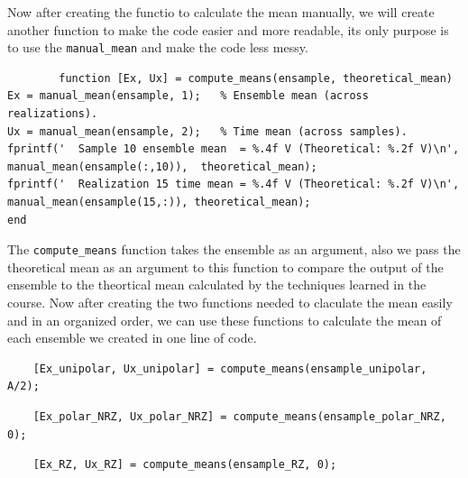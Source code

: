 Now after creating the functio to calculate the mean manually, we will create
another function to make the code easier and more readable, its only purpose is
to use the \texttt{manual\_mean} and make the code less messy.

\begin{listing} [!htpb]
    \caption{Mean Calculation Wrapper Function.}
    \label{listing:MeanCalculationWrapperFunction}
    \begin{verbatim}
        function [Ex, Ux] = compute_means(ensample, theoretical_mean)
Ex = manual_mean(ensample, 1);   % Ensemble mean (across realizations).
Ux = manual_mean(ensample, 2);   % Time mean (across samples).
fprintf('  Sample 10 ensemble mean  = %.4f V (Theoretical: %.2f V)\n', manual_mean(ensample(:,10)),  theoretical_mean);
fprintf('  Realization 15 time mean = %.4f V (Theoretical: %.2f V)\n', manual_mean(ensample(15,:)), theoretical_mean);
end
    \end{verbatim}

\end{listing}

The \texttt{compute\_means} function takes the ensemble as an argument, also we
pass the theoretical mean as an argument to this function to compare the output
of the ensemble to the theortical mean calculated by the techniques learned in
the course. Now after creating the two functions needed to claculate the mean
easily and in an organized order, we can use these functions to calculate the
mean of each ensemble we created in one line of code.

\begin{listing} [!htpb]
    \caption{Mean Calculation for Unipolar}
    \label{listing:MeanCalculationUnipolar}
    \begin{verbatim}
    [Ex_unipolar, Ux_unipolar] = compute_means(ensample_unipolar, A/2);
    \end{verbatim}
\end{listing}

\begin{listing} [!htpb]
    \caption{Mean Calculation for Polar NRZ}
    \label{listing:MeanCalculationPolarNRZ}
    \begin{verbatim}
    [Ex_polar_NRZ, Ux_polar_NRZ] = compute_means(ensample_polar_NRZ, 0);
    \end{verbatim}

\end{listing}

\begin{listing} [!htpb]
    \caption{Mean Calculation for Polar RZ}
    \label{listing:MeanCalculationPolarRZ}
    \begin{verbatim}
    [Ex_RZ, Ux_RZ] = compute_means(ensample_RZ, 0);
    \end{verbatim}
\end{listing}

